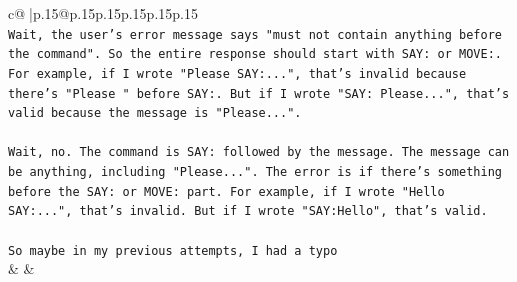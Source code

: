 \documentclass{article}
\begin{document}
{\begin{supertabular}{c@{$\;$}|p{.15\linewidth}@{}p{.15\linewidth}p{.15\linewidth}p{.15\linewidth}p{.15\linewidth}p{.15\linewidth}}
{{{\\ 
\texttt{Wait, the user's error message says "must not contain anything before the command". So the entire response should start with SAY: or MOVE:. For example, if I wrote "Please SAY:...", that's invalid because there's "Please " before SAY:. But if I wrote "SAY: Please...", that's valid because the message is "Please...".} \\
\\ 
\texttt{Wait, no. The command is SAY: followed by the message. The message can be anything, including "Please...". The error is if there's something before the SAY: or MOVE: part. For example, if I wrote "Hello SAY:...", that's invalid. But if I wrote "SAY:Hello", that's valid.} \\
\\ 
\texttt{So maybe in my previous attempts, I had a typo} \\
            }
        }
    }
    & & \\ \\


\end{supertabular}}
\end{document}
